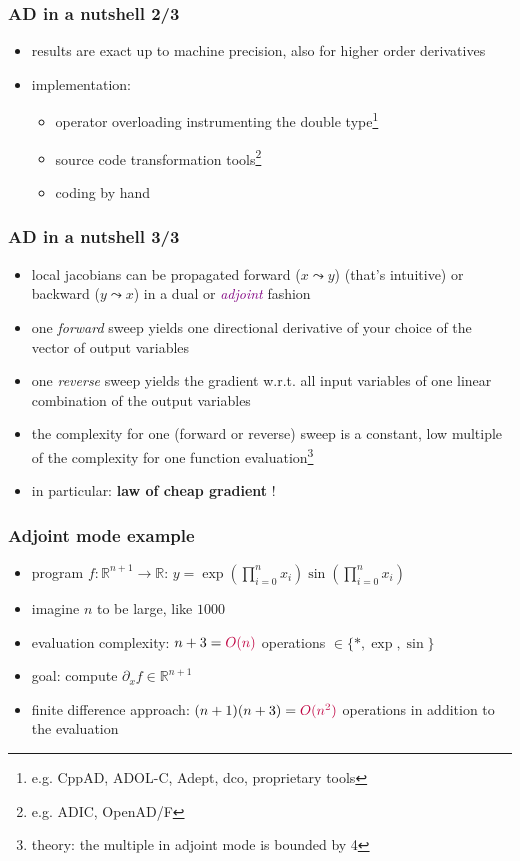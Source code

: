\documentclass[10pt,German]{beamer}
\begin{document}
\begin{frame}[fragile]
\frametitle{AD in a nutshell 2/3}
\begin{itemize}
\item results are exact up to machine precision, also for higher order derivatives
\item implementation: \begin{itemize}
\item operator overloading instrumenting the double type\footnote{e.g. CppAD, ADOL-C, Adept, dco, proprietary tools}
\item source code transformation tools\footnote{e.g. ADIC, OpenAD/F}
\item coding by hand
\end{itemize}
\end{itemize}
\end{frame}

\begin{frame}[fragile]
\frametitle{AD in a nutshell 3/3}
\begin{itemize}
\item local jacobians can be propagated forward ($x\leadsto y$) (that's intuitive)  or backward ($y\leadsto x$) in a dual or \textcolor{purple}{\textit{adjoint}} fashion
\item one \textit{forward} sweep yields one directional derivative of your choice of the vector of output variables
\item one \textit{reverse} sweep yields the gradient w.r.t. all input variables of one linear combination of the output variables
\item the complexity for one (forward or reverse) sweep is a constant, low multiple of the complexity for one function evaluation\footnote{theory: the multiple in adjoint mode is bounded by 4}
\item in particular: \textbf{law of cheap gradient} !
\end{itemize}
\end{frame}

\begin{frame}[fragile]
\frametitle{Adjoint mode example}
\begin{itemize}
\item program $f:\mathbb{R}^{n+1}\rightarrow\mathbb{R}$: $y = \exp\left( \prod_{i=0}^n x_i \right) \sin\left( \prod_{i=0}^n x_i \right)$
\item imagine $n$ to be large, like $1000$
\item evaluation complexity: $n+3=\textcolor{purple}{O(n)}$ operations $\in \{*, \exp, \sin \}$
\item goal: compute $\partial_x f \in \mathbb{R}^{n+1}$
\item finite difference approach: $(n+1)(n+3) = \textcolor{purple}{O(n^2)}$ operations in addition to the evaluation
\end{itemize}
\end{frame}
\end{document}
